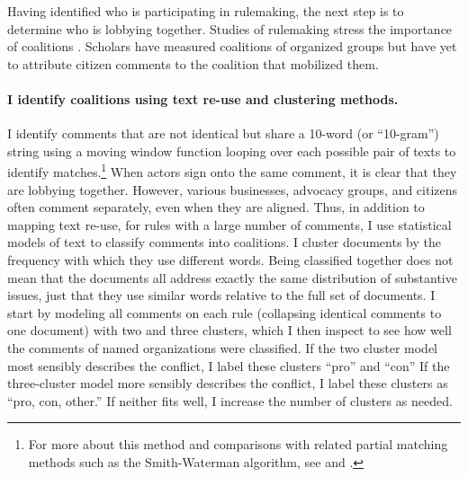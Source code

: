 \documentclass[
      12pt,
        ]{article}
\begin{document}
Having identified who is participating in rulemaking, the next step is
to determine who is lobbying together. Studies of rulemaking stress the importance of coalitions \citep[Dwidar2019]{Yackee2006JOP}. Scholars have measured coalitions of organized groups but have yet to attribute citizen comments to the coalition that mobilized them.

\hypertarget{i-identify-coalitions-using-text-re-use-and-clustering-methods.}{%
\paragraph{I identify coalitions using text re-use and clustering methods.}\label{i-identify-coalitions-using-text-re-use-and-clustering-methods.}}

I identify comments that are not identical but share a 10-word (or
``10-gram'') string using a moving window function looping over each
possible pair of texts to identify matches.\footnote{For more about this method and comparisons with related partial matching methods such as the Smith-Waterman algorithm, see \citet{Casas2017} and \citet{Judge-Lord2017}.}
When actors sign onto the same comment, it is clear that they are
lobbying together. However, various businesses, advocacy groups, and
citizens often comment separately, even when they are aligned. Thus, in addition to mapping text re-use, for rules with a large number of comments,
I use statistical models of text to classify comments into coalitions. I cluster
documents by the frequency with which they use different words. Being
classified together does not mean that the documents all address exactly
the same distribution of substantive issues, just that they use similar
words relative to the full set of documents. I start by modeling all
comments on each rule (collapsing identical comments to one document)
with two and three clusters, which I then inspect to see how well the
comments of named organizations were classified. If the two cluster
model most sensibly describes the conflict, I label these clusters ``pro'' and ``con'' If the three-cluster model more sensibly describes the
conflict, I label these clusters as ``pro, con, other.'' If neither fits
well, I increase the number of clusters as needed.
\end{document}
